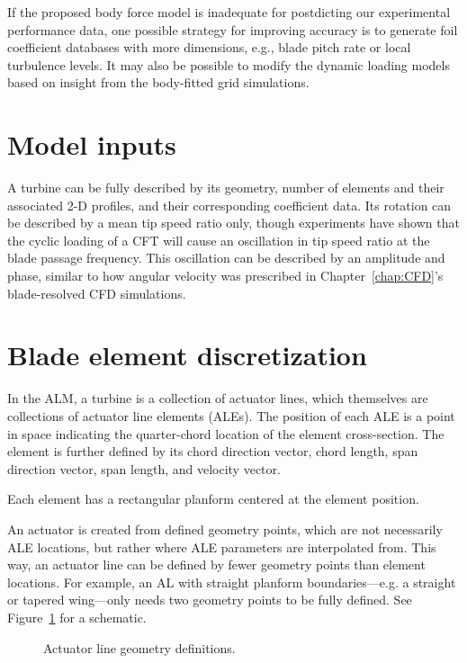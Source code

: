 If the proposed body force model is inadequate for postdicting our experimental
performance data, one possible strategy for improving accuracy is to generate
foil coefficient databases with more dimensions, e.g., blade pitch rate or local
turbulence levels. It may also be possible to modify the dynamic loading models
based on insight from the body-fitted grid simulations.



\section{Model inputs}

A turbine can be fully described by its geometry, number of elements and their
associated 2-D profiles, and their corresponding coefficient data. Its rotation
can be described by a mean tip speed ratio only, though experiments have shown
that the cyclic loading of a CFT will cause an oscillation in tip speed ratio at
the blade passage frequency. This oscillation can be described by an amplitude
and phase, similar to how angular velocity was prescribed in
Chapter~\ref{chap:CFD}'s blade-resolved CFD simulations.


\section{Blade element discretization}

In the ALM, a turbine is a collection of actuator lines, which themselves are
collections of actuator line elements (ALEs). The position of each ALE is a
point in space indicating the quarter-chord location of the element
cross-section. The element is further defined by its chord direction vector,
chord length, span direction vector, span length, and velocity vector.

Each element has a rectangular planform centered at the element position.

An actuator is created from defined geometry points, which are not necessarily
ALE locations, but rather where ALE parameters are interpolated from. This way,
an actuator line can be defined by fewer geometry points than element locations.
For example, an AL with straight planform boundaries---e.g. a straight or
tapered wing---only needs two geometry points to be fully defined. See
Figure~\ref{fig:AL-geom} for a schematic.

\begin{figure}[ht]
    \caption{Actuator line geometry definitions.}
    
    \label{fig:AL-geom}
\end{figure}



